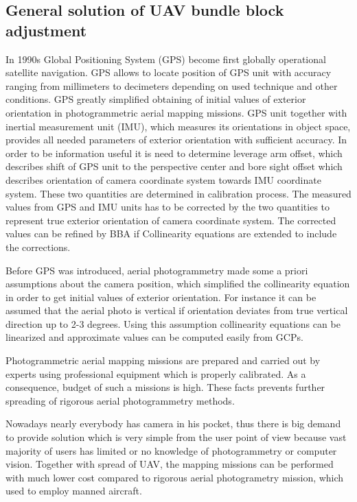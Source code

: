 \documentclass[a4paper,12pt]{article}
\begin{document}
\subsection{General solution of UAV bundle block adjustment}


In 1990s Global Positioning System (GPS) become first globally operational satellite navigation.
GPS allows 
to locate position of GPS unit with accuracy ranging  from  millimeters to decimeters depending 
on used technique and other conditions. 
GPS greatly simplified obtaining of initial values of exterior orientation in photogrammetric aerial mapping missions.
GPS unit together with 
inertial measurement unit (IMU), which measures its orientations in object space,
provides all needed parameters of exterior orientation with sufficient accuracy. In order to be information useful it is need to determine 
leverage arm offset, which describes shift of GPS unit to the perspective center and bore sight offset
which describes orientation of camera coordinate system towards IMU coordinate system. These two
quantities are determined in calibration process. The measured values from GPS and IMU units has to
be corrected by the two quantities to represent true exterior orientation of camera coordinate system. The corrected values 
can be refined by BBA if Collinearity equations are extended to include the corrections.

Before GPS was introduced, aerial photogrammetry made some a priori assumptions about the camera position,
which simplified the collinearity equation in order to get initial values of exterior orientation. 
For instance it can be assumed that the aerial photo is vertical if orientation deviates from true vertical
direction up to 2-3 degrees. Using this assumption collinearity equations can be linearized and 
approximate values can be computed easily from GCPs.

Photogrammetric aerial mapping missions are prepared and carried out by experts using 
professional equipment which is properly calibrated.
As a consequence, budget of such a missions
is high. These facts prevents further spreading of rigorous aerial photogrammetry methods.

Nowadays nearly everybody has camera in his pocket, thus there is big demand 
to provide solution which is very simple from the user point of view because 
vast majority of users has limited or no knowledge of photogrammetry or computer vision. 
Together with spread of UAV, the mapping missions can be performed with much lower 
cost compared to rigorous aerial photogrametry mission, which used to employ manned aircraft.
\end{document}
